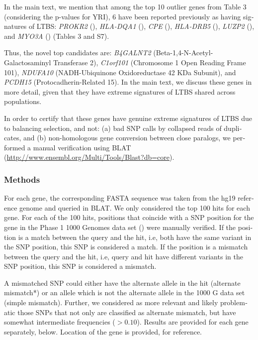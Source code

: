 \begin{refsection}
\begin{otherlanguage}{english}
\begin{footnotesize}
In the main text, we mention that among the top 10 outlier genes from Table 3 (considering the p-values for YRI), 6 have been reported previously as having signatures of LTBS: \emph{PROKR2} (\cite{Leffler2013a}), \emph{HLA-DQA1} (\cite{DeGiorgio2014}), \emph{CPE} (\cite{DeGiorgio2014}), \emph{HLA-DRB5} (\cite{DeGiorgio2014}), \emph{LUZP2} (\cite{DeGiorgio2014}), and \emph{MYO3A} (\cite{Kummerfeld2005,DeGiorgio2014}) (Tables 3 and S7). %

Thus, the novel top candidates are: \emph{B4GALNT2} (Beta-1,4-N-Acetyl-Galactosaminyl Transferase 2), \emph{C1orf101} (Chromosome 1 Open Reading Frame 101),  \emph{NDUFA10} (NADH-Ubiquinone Oxidoreductase 42 KDa Subunit), and \emph{PCDH15} (Protocadherin-Related 15). In the main text, we discuss these genes in more detail, given that they have extreme signatures of LTBS shared across populations. 

In order to certify that these genes have genuine extreme signatures of LTBS due to balancing selection, and not: (a) bad SNP calls by collapsed reads of duplicates, and (b) non-homologous gene conversion between close paralogs, we performed a manual verification using BLAT (\url{http://www.ensembl.org/Multi/Tools/Blast?db=core}).

\subsubsection{Methods}

For each gene, the corresponding FASTA sequence was taken from the hg19 reference genome and queried in BLAT. We only considered the top 100 hits for each gene. For each of the 100 hits, positions that coincide with a SNP position for the gene in the Phase 1 1000 Genomes data set (\cite{Abecasis2012}) were manually verified. If the position is a match between the query and the hit, i.e, both have the same variant in the SNP position, this SNP is considered a match. If the position is a mismatch between the query and the hit, i.e, query and hit have different variants in the SNP position, this SNP is considered a mismatch. 

A mismatched SNP could either have the alternate allele in the hit (alternate mismatch*) or an allele which is not the alternate allele in the 1000 G data set (simple mismatch). Further, we considered as more relevant and likely problematic those SNPs that not only are classified as alternate mismatch, but have somewhat intermediate frequencies ($>0.10$). Results are provided for each gene separately, below. Location of the gene is provided, for reference.


\end{footnotesize}
\end{otherlanguage}
\end{refsection}
